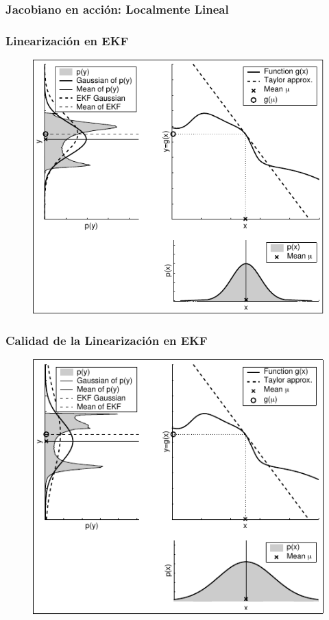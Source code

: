 \begin{frame}
    \frametitle{Jacobiano en acción: Localmente Lineal}

    \begin{center}
    \end{center}


\end{frame}


\begin{frame}
    \frametitle{Linearización en EKF}
    
    \begin{figure}[!h]
        \includegraphics[width=0.5\columnwidth]{./images/linearization_applied_by_ekf.pdf}
    \end{figure}
\end{frame}


\begin{frame}
    \frametitle{Calidad de la Linearización en EKF}
    
    \begin{figure}[!h]
        \includegraphics[width=0.5\columnwidth]{./images/dependency_approximation_quality_spread.pdf}
    \end{figure}
\end{frame}

